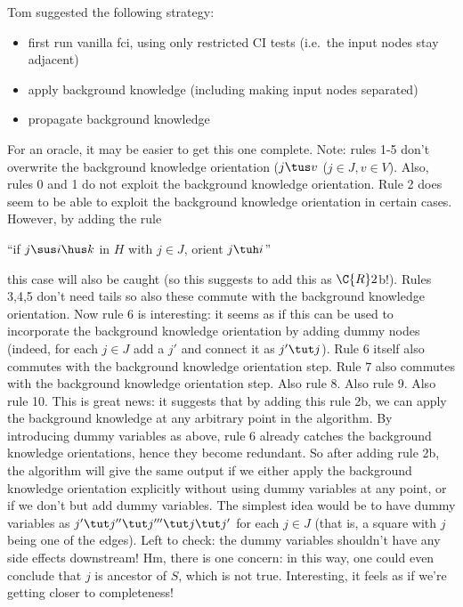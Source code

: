 {\begin{enumerate}
    Tom suggested the following strategy:
    \begin{itemize}
      \item first run vanilla fci, using only restricted CI tests (i.e.\ the input nodes stay adjacent)
      \item apply background knowledge (including making input nodes separated)
      \item propagate background knowledge
    \end{itemize}
    For an oracle, it may be easier to get this one complete.
    Note: rules 1-5 don't overwrite the background knowledge orientation ($j \tus v$ ($j\in J, v\in V$).
    Also, rules 0 and 1 do not exploit the background knowledge orientation.
    Rule 2 does seem to be able to exploit the background knowledge orientation in certain cases.
    However, by adding the rule 
      \begin{center}``if $j \sus i \hus k$ in $H$ with $j \in J$, orient $j \tuh i$''\end{center}
    this case will also be caught (so this suggests to add this as $\C{R}2$b!).
    Rules 3,4,5 don't need tails so also these commute with the background knowledge orientation.
    Now rule 6 is interesting: it seems as if this can be used to incorporate the background knowledge orientation by adding dummy nodes
    (indeed, for each $j \in J$ add a $j'$ and connect it as $j' \tut j$).
    Rule 6 itself also commutes with the background knowledge orientation step.
    Rule 7 also commutes with the background knowledge orientation step.
    Also rule 8. Also rule 9. Also rule 10.
    This is great news: it suggests that by adding this rule 2b, we can apply the background knowledge at any arbitrary point in the algorithm.
    By introducing dummy variables as above, rule 6 already catches the background knowledge orientations, hence they become redundant.
    So after adding rule 2b, the algorithm will give the same output if we either apply the background knowledge orientation 
    explicitly without using dummy variables at any point, or if we don't but add dummy variables.
    The simplest idea would be to have dummy variables as $j' \tut j'' \tut j''' \tut j \tut j'$ for each $j \in J$ (that is, a square with $j$ being one of the edges).
    Left to check: the dummy variables shouldn't have any side effects downstream!
    Hm, there is one concern: in this way, one could even conclude that $j$ is ancestor of $S$, which is not true.
    Interesting, it feels as if we're getting closer to completeness!


\end{enumerate}}
